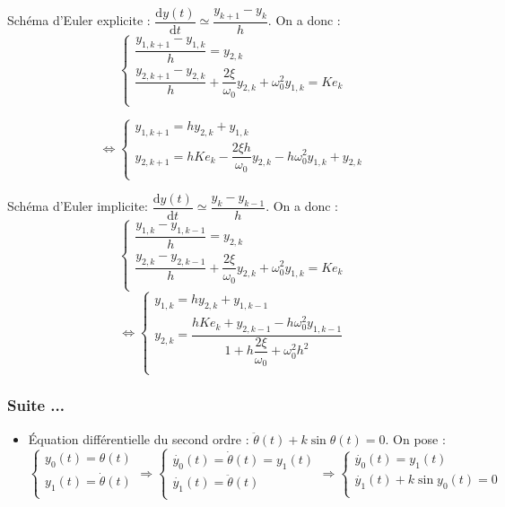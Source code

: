 \footnotesize{

Schéma d'Euler explicite :   $\dfrac{\text{d} y(t)}{\text{d}t}\simeq \dfrac{y_{k+1}-y_k}{h}$. On a donc :
$$
\left\{
\begin{array}{l}
\dfrac{y_{1,k+1}-y_{1,k}}{h} = y_{2,k} \\
\dfrac{y_{2,k+1}-y_{2,k}}{h} + \dfrac{2\xi}{\omega_0} y_{2,k}+ \omega_0^2 y_{1,k} = Ke_k \\
\end{array}
\right.
$$ 

$$\Leftrightarrow 
\left\{
\begin{array}{l}
y_{1,k+1} = h y_{2,k} +y_{1,k} \\
y_{2,k+1}  = hKe_k - \dfrac{2\xi h}{\omega_0} y_{2,k}- h\omega_0^2 y_{1,k} + y_{2,k}\\
\end{array}
\right.
$$ 


Schéma d'Euler implicite: $\dfrac{\text{d} y(t)}{\text{d}t}\simeq \dfrac{y_{k}-y_{k-1}}{h}$. On a donc :
$$
\left\{
\begin{array}{l}
\dfrac{y_{1,k}-y_{1,k-1}}{h} = y_{2,k} \\
\dfrac{y_{2,k}-y_{2,k-1}}{h} + \dfrac{2\xi}{\omega_0} y_{2,k}+ \omega_0^2 y_{1,k} = Ke_k \\
\end{array}
\right.$$
$$
\Leftrightarrow 
\left\{
\begin{array}{l}
y_{1,k} = hy_{2,k}+y_{1,k-1} \\
y_{2,k} =\dfrac{h Ke_k+y_{2,k-1} - h\omega_0^2 y_{1,k-1}}{1+  h \dfrac{2\xi}{\omega_0} +  \omega_0^2 h^2 } \\
\end{array}
\right.$$

\normalsize


\subsubsection{Suite ...}
\begin{itemize}[label=,font=\color{red}] 
\item Équation différentielle du second ordre : $\ddot{\theta}(t) + k \sin \theta(t) = 0$.
On pose : 
$$
\left\{
\begin{array}{l}
y_0(t) = \theta(t) \\
y_1(t) = \dot{\theta}(t) \\
\end{array}
\right. 
\Rightarrow 
\left\{
\begin{array}{l}
\dot{y_0}(t) = \dot{\theta}(t) = y_1(t) \\
\dot{y_1}(t) = \ddot{\theta}(t) \\
\end{array}
\right.
\Rightarrow 
\left\{
\begin{array}{l}
\dot{y_0}(t) = y_1(t) \\
\dot{y_1}(t) + k \sin y_0 (t) = 0 \\
\end{array}
\right.
$$




\end{itemize}}
